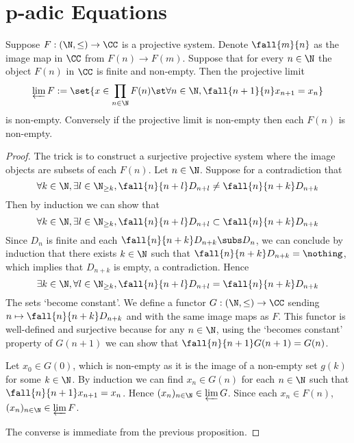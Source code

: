 \section{p-adic Equations}

\begin{prop}
    Suppose $F : (\N,\le) \to \CC$ is a projective system.
    Denote $\fall{m}{n}$ as the image map in $\CC$ 
    from $F(n) \to F(m)$.
    Suppose that for every $n \in \N$ the object
    $F(n)$ in $\CC$ is finite and non-empty.
    Then the projective limit 
    \[\varprojlim F := \set{
        x \in \prod_{n\in \N} F(n) \st \forall n \in \N, 
        \fall{n+1}{n}x_{n+1} = x_n}\]
    is non-empty.
    Conversely if the projective limit is non-empty
    then each $F(n)$ is non-empty.
\end{prop}
\begin{proof}
    The trick is to construct a surjective projective system where
    the image objects are subsets of each $F(n)$.
    Let $n \in \N$.
    Suppose for a contradiction that 
    \[\forall k \in \N, \exists l \in \N_{\ge k}, 
    \fall{n}{n+l} D_{n+l} \ne \fall{n}{n+k} D_{n+k}\]
    Then by induction we can show that 
    \[\forall k \in \N, \exists l \in \N_{\ge k}, 
    \fall{n}{n+l} D_{n+l} \subset \fall{n}{n+k} D_{n+k}\]
    Since $D_n$ is finite and each 
    $\fall{n}{n+k} D_{n+k} \subs D_n$,
    we can conclude by induction that there exists 
    $k \in \N$ such that 
    $\fall{n}{n+k} D_{n+k} = \nothing$,
    which implies that $D_{n+k}$ is empty,
    a contradiction.
    Hence 
    \[\exists k \in \N, \forall l \in \N_{\ge k}, 
    \fall{n}{n+l} D_{n+l} = \fall{n}{n+k} D_{n+k}\]
    The sets `become constant'.
    We define a functor $G : (\N,\le) \to \CC$
    sending $n \mapsto \fall{n}{n+k} D_{n+k}$ and
    with the same image maps as $F$.
    This functor is well-defined and surjective because
    for any $n\in \N$, 
    using the `becomes constant' property of $G(n + 1)$
    we can show that $\fall{n}{n+1} G(n+1) = G(n)$.
    
    Let $x_0 \in G(0)$, 
    which is non-empty as it is the 
    image of a non-empty set $g(k)$ for some
    $k \in \N$.
    By induction we can find $x_n \in G(n)$ 
    for each $n \in \N$ such that 
    $\fall{n}{n + 1} x_{n+1} = x_n$.
    Hence $(x_n)_{n \in \N} \in \varprojlim G$.
    Since each $x_n \in F(n)$, 
    $(x_n)_{n \in \N} \in \varprojlim F$.

    The converse is immediate from the previous proposition.
\end{proof}

